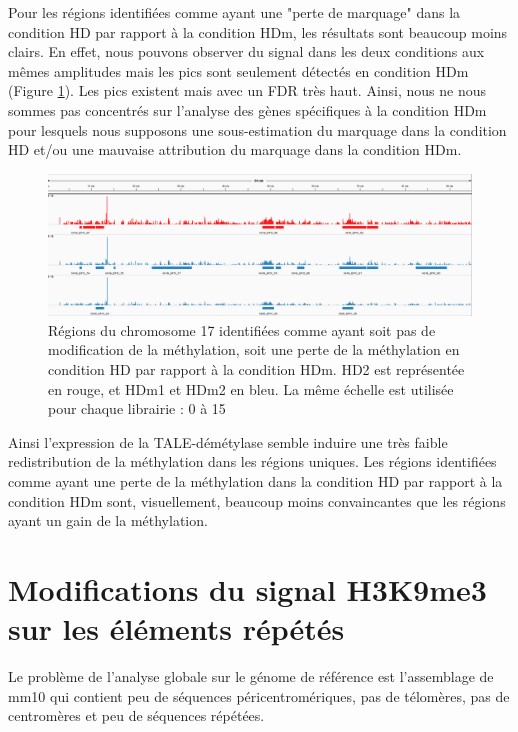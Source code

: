 \documentclass[a4paper,12pt,times]{report}
\newcommand{\scaption}[1]{\caption{\footnotesize{#1}}}
\begin{document}
Pour les régions identifiées comme ayant une "perte de marquage" dans la condition HD par rapport à la condition HDm, les résultats sont beaucoup moins clairs. En effet, nous pouvons observer du signal dans les deux conditions aux mêmes amplitudes mais les pics sont seulement détectés en condition HDm (Figure \ref{perte}). Les pics existent mais avec un FDR très haut. Ainsi, nous ne nous sommes pas concentrés sur l'analyse des gènes spécifiques à la condition HDm pour lesquels nous supposons une sous-estimation du marquage dans la condition HD et/ou une mauvaise attribution du marquage dans la condition HDm.


\begin{figure}[!h]
\centering
\includegraphics[scale=0.28]{IGV_chr17.png}
\scaption{Régions du chromosome 17 identifiées comme ayant soit pas de modification de la méthylation, soit une perte de la méthylation en condition HD par rapport à la condition HDm.
HD2 est représentée en rouge, et HDm1 et HDm2 en bleu. La même échelle est utilisée pour chaque librairie : 0 à 15}
\label{perte}
\end{figure}


Ainsi l'expression de la TALE-démétylase semble induire une très faible redistribution de la méthylation dans les régions uniques. Les régions identifiées comme ayant une perte de la méthylation dans la condition HD par rapport à la condition HDm sont, visuellement, beaucoup moins convaincantes que les régions ayant un gain de la méthylation.


    \section{Modifications du signal H3K9me3 sur les éléments répétés }
 Le problème de l'analyse globale sur le génome de référence est l'assemblage de mm10 qui contient peu de séquences péricentromériques, pas de télomères, pas de centromères et peu de séquences répétées.
   
\end{document}
